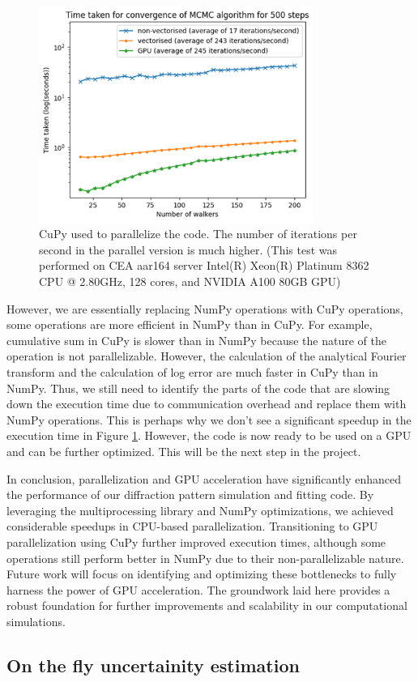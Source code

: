 \begin{figure}[h]
    \centering
    \includegraphics[width=0.8\textwidth]{images/gpu.png}
    \caption{CuPy used to parallelize the code. The number of iterations per second in the parallel version is much higher. (This test was performed on CEA aar164 server Intel(R) Xeon(R) Platinum 8362 CPU @ 2.80GHz, 128 cores, and NVIDIA A100 80GB GPU)}
    \label{fig:cupy}
\end{figure}

\FloatBarrier

However, we are essentially replacing NumPy operations with CuPy operations, some operations are more efficient in NumPy than in CuPy. For example, cumulative sum in CuPy is slower than in NumPy because the nature of the operation is not parallelizable. However, the calculation of the analytical Fourier transform and the calculation of log error are much faster in CuPy than in NumPy. Thus, we still need to identify the parts of the code that are slowing down the execution time due to communication overhead and replace them with NumPy operations. This is perhaps why we don't see a significant speedup in the execution time in Figure \ref{fig:cupy}. However, the code is now ready to be used on a GPU and can be further optimized. This will be the next step in the project.

\medskip

In conclusion, parallelization and GPU acceleration have significantly enhanced the performance of our diffraction pattern simulation and fitting code. By leveraging the multiprocessing library and NumPy optimizations, we achieved considerable speedups in CPU-based parallelization. Transitioning to GPU parallelization using CuPy further improved execution times, although some operations still perform better in NumPy due to their non-parallelizable nature. Future work will focus on identifying and optimizing these bottlenecks to fully harness the power of GPU acceleration. The groundwork laid here provides a robust foundation for further improvements and scalability in our computational simulations.


\subsection{On the fly uncertainity estimation}